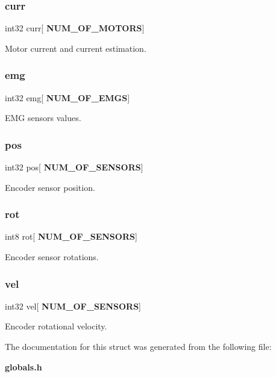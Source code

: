 \subsubsection{curr}
{\footnotesize\ttfamily int32 curr[\textbf{ N\+U\+M\+\_\+\+O\+F\+\_\+\+M\+O\+T\+O\+RS}]}

Motor current and current estimation. \mbox{\label{structst__meas_a3d1b5e40ddbb5e34307f6b8e9cc116ff}} 
\subsubsection{emg}
{\footnotesize\ttfamily int32 emg[\textbf{ N\+U\+M\+\_\+\+O\+F\+\_\+\+E\+M\+GS}]}

E\+MG sensors values. \mbox{\label{structst__meas_a3ee4913e7257d25d3e47cbbada9c8546}} 
\subsubsection{pos}
{\footnotesize\ttfamily int32 pos[\textbf{ N\+U\+M\+\_\+\+O\+F\+\_\+\+S\+E\+N\+S\+O\+RS}]}

Encoder sensor position. \mbox{\label{structst__meas_a26b47db1884c475bc42d76a709349f97}} 
\subsubsection{rot}
{\footnotesize\ttfamily int8 rot[\textbf{ N\+U\+M\+\_\+\+O\+F\+\_\+\+S\+E\+N\+S\+O\+RS}]}

Encoder sensor rotations. \mbox{\label{structst__meas_a8ef1e0e837efdf852aa286d20625d6a1}} 
\subsubsection{vel}
{\footnotesize\ttfamily int32 vel[\textbf{ N\+U\+M\+\_\+\+O\+F\+\_\+\+S\+E\+N\+S\+O\+RS}]}

Encoder rotational velocity. 

The documentation for this struct was generated from the following file\+:\begin{DoxyCompactItemize}
\item 
\textbf{ globals.\+h}\end{DoxyCompactItemize}
